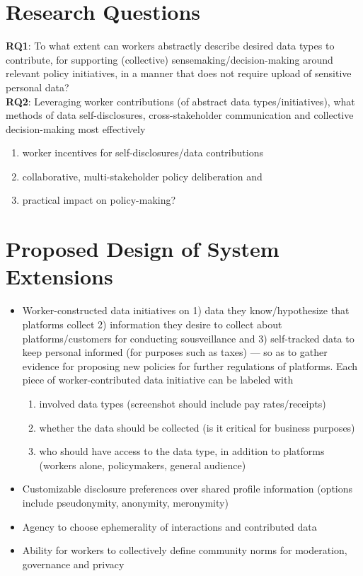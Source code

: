 \section{Research Questions}
\textbf{RQ1}: To what extent can workers abstractly describe desired data types to contribute, for supporting (collective) sensemaking/decision-making around relevant policy initiatives, in a manner that does not require upload of sensitive personal data?  \\
\textbf{RQ2}: Leveraging worker contributions (of abstract data types/initiatives), what methods of data self-disclosures, cross-stakeholder communication and collective decision-making most effectively
\begin{enumerate}
    \item worker incentives for self-disclosures/data contributions
    \item collaborative, multi-stakeholder policy deliberation and
    \item practical impact on policy-making?
\end{enumerate}
\section{Proposed Design of System Extensions}
\begin{itemize}
    \item Worker-constructed data initiatives on 1) data they know/hypothesize that platforms collect 2) information they desire to collect about platforms/customers for conducting sousveillance and 3) self-tracked data to keep personal informed (for purposes such as taxes) --- so as to gather evidence for proposing new policies for further regulations of platforms. Each piece of worker-contributed data initiative can be labeled with
    \begin{enumerate}
        \item involved data types (screenshot should include pay rates/receipts)
        \item whether the data should be collected (is it critical for business purposes)
        \item who should have access to the data type, in addition to platforms (workers alone, policymakers, general audience)
    \end{enumerate}
    \item Customizable disclosure preferences over shared profile information (options include pseudonymity, anonymity, meronymity)
    \item Agency to choose ephemerality of interactions and contributed data
    \item Ability for workers to collectively define community norms for moderation, governance and privacy
\end{itemize}

